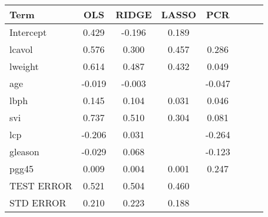 \documentclass{article}
\begin{document}
\begin{tabular}{l*{6}{c}r}
Term              & OLS & RIDGE & LASSO & PCR  \\
\hline
Intercept         & 0.429 & -0.196 & 0.189 &  \\
lcavol            & 0.576 & 0.300 & 0.457 & 0.286  \\
lweight           & 0.614 & 0.487 & 0.432 & 0.049  \\
age               & -0.019 & -0.003 &  & -0.047  \\
lbph			  & 0.145 & 0.104 & 0.031 & 0.046 \\
svi				  & 0.737 & 0.510 & 0.304 & 0.081 \\
lcp				  & -0.206 & 0.031 & & -0.264 \\
gleason			  & -0.029 & 0.068 & & -0.123 \\
pgg45			  & 0.009 & 0.004 & 0.001 & 0.247 \\
\hline
TEST ERROR		  & 0.521 & 0.504 & 0.460 & \\
STD ERROR		  & 0.210 & 0.223 & 0.188 & \\

\end{tabular}
\end{document}
